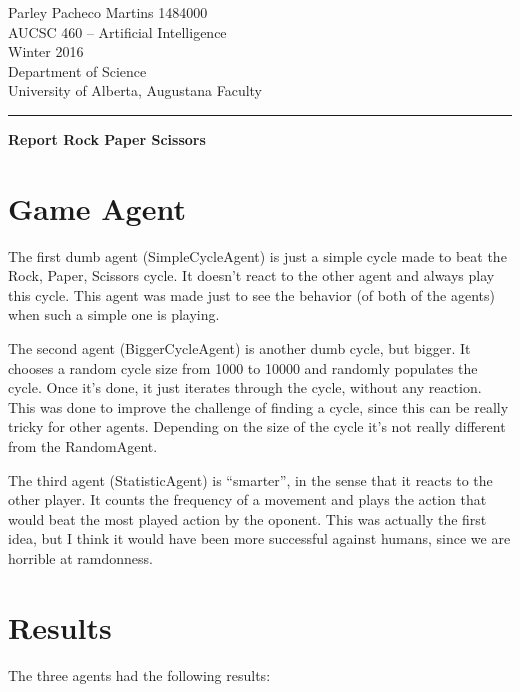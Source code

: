 \documentclass[12pt]{article}
\begin{document}
\noindent
Parley Pacheco Martins 1484000\\
AUCSC 460 -- Artificial Intelligence\\
Winter 2016\\
Department of Science\\
University of Alberta, Augustana Faculty

\vspace*{0.75\baselineskip}
\hrule
\vspace*{0.75\baselineskip}

\noindent
{\Large\bf Report Rock Paper Scissors }

\section{Game Agent}

The first dumb agent (SimpleCycleAgent) is just a simple cycle made to beat the Rock, Paper, Scissors cycle.
It doesn't react to the other agent and always play this cycle.
This agent was made just to see the behavior (of both of the agents) when such a simple one is playing.

The second agent (BiggerCycleAgent) is another dumb cycle, but bigger.
It chooses a random cycle size from 1000 to 10000 and randomly populates the cycle.
Once it's done, it just iterates through the cycle, without any reaction.
This was done to improve the challenge of finding a cycle, since this can be really tricky for other agents.
Depending on the size of the cycle it's not really different from the RandomAgent.

The third agent (StatisticAgent) is ``smarter'', in the sense that it reacts to the other player.
It counts the frequency of a movement and plays the action that would beat the most played action by the oponent.
This was actually the first idea, but I think it would have been more successful against humans, since we are horrible at ramdonness.



\section{Results}

The three agents had the following results:
\end{document}
